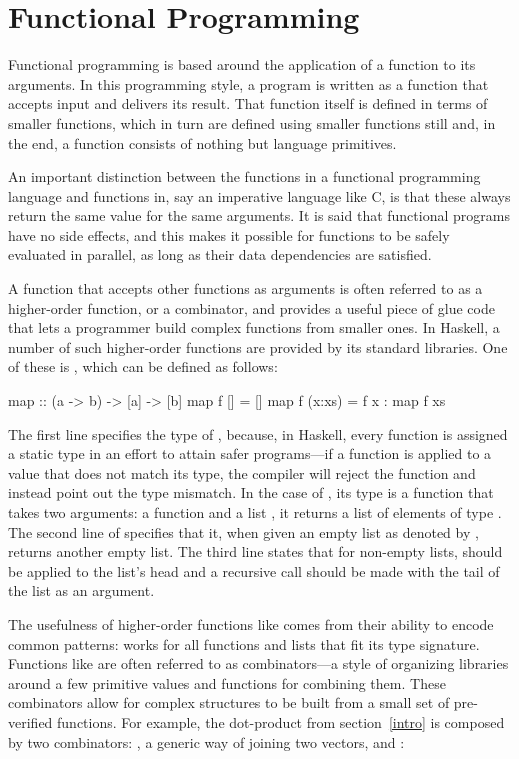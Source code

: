 \documentclass[../paper.tex]{subfiles}
\begin{document}
\section{Functional Programming}
\label{functional}

Functional programming is based around the application of a function to its arguments. In this programming style, a program is written as a function that accepts input and delivers its result. That function itself is defined in terms of smaller functions, which in turn are defined using smaller functions still and, in the end, a function consists of nothing but language primitives.

An important distinction between the functions in a functional programming language and functions in, say an imperative language like C, is that these always return the same value for the same arguments. It is said that functional programs have no side effects, and this makes it possible for functions to be safely evaluated in parallel, as long as their data dependencies are satisfied.

A function that accepts other functions as arguments is often referred to as a higher-order function, or a combinator, and provides a useful piece of glue code that lets a programmer build complex functions from smaller ones. In Haskell, a number of such higher-order functions are provided by its standard libraries. One of these is , which can be defined as follows:

\begin{code}
map :: (a -> b) -> [a] -> [b]
map f []     = []
map f (x:xs) = f x : map f xs
\end{code}

The first line specifies the type of , because, in Haskell, every function is assigned a static type in an effort to attain safer programs---if a function is applied to a value that does not match its type, the compiler will reject the function and instead point out the type mismatch. In the case of , its type is a function that takes two arguments: a function  and a list , it returns a list of elements of type . The second line of  specifies that it, when given an empty list as denoted by \codei{[]}, returns another empty list. The third line states that for non-empty lists,  should be applied to the list's head and a recursive call should be made with the tail of the list as an argument.

The usefulness of higher-order functions like  comes from their ability to encode common patterns:  works for all functions and lists that fit its type signature. Functions like  are often referred to as combinators---a style of organizing libraries around a few primitive values and functions for combining them. These combinators allow for complex structures to be built from a small set of pre-verified functions. For example, the dot-product from section~\ref{intro} is composed by two combinators: , a generic way of joining two vectors, and :
\end{document}

